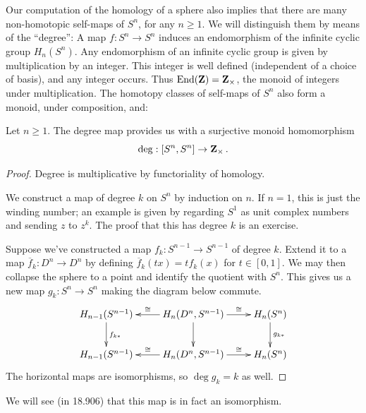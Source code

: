 Our computation of the homology of a sphere also implies that there are many non-homotopic self-maps of $S^n$, for any $n\geq1$. We will distinguish them by means of the ``degree'': A map $f:S^n\to S^n$ induces an endomorphism of the infinite cyclic group $H_n(S^n)$. Any endomorphism of an infinite cyclic group is given by multiplication by an integer. This integer is well defined (independent of a choice of basis), and any integer occurs. Thus $\mathrm{End}(\mathbf Z)=\mathbf Z_\times$, the monoid of integers under multiplication. The homotopy classes of self-maps of $S^n$ also form a monoid, under composition, and: 
\begin{theorem}
Let $n\geq 1$. The degree map provides us with a surjective monoid homomorphism
\[
\mathrm{deg}:[S^n,S^n]\to \mathbf Z_\times\,.
\]
\end{theorem}
\begin{proof}
Degree is multiplicative by functoriality of homology.

We construct a map of degree $k$ on $S^n$ by induction on $n$. If $n=1$, this is just the winding number; an example is given by regarding $S^1$ as unit complex numbers and sending $z$ to $z^k$. The proof that this has degree $k$ is an exercise. 

Suppose we've constructed a map $f_k:S^{n-1}\to S^{n-1}$ of degree $k$. 
Extend it to a map $\overline f_k:D^n\to D^n$ by defining 
$\overline f_k(tx)=tf_k(x)$ for $t\in[0,1]$. We may then collapse the sphere
to a point and identify the quotient with $S^n$. This gives us a new map
$g_k:S^n\to S^n$ making the diagram below commute.
	\begin{equation*}
	\xymatrix{ H_{n-1}(S^{n-1})\ar[d]^{f_{k*}} & \ar[l]_-\cong H_n(D^n,S^{n-1})\ar[r]^-\cong\ar[d] & H_n(S^n) \ar[d]^{g_{k*}}\\
	 H_{n-1}(S^{n-1}) & \ar[l]_-\cong H_n(D^n,S^{n-1})\ar[r]^-\cong & H_n(S^n)}
	\end{equation*}
The horizontal maps are isomorphisms, so $\deg g_k=k$ as well.
\end{proof}

We will see (in 18.906) that this map is in fact an isomorphism. 

